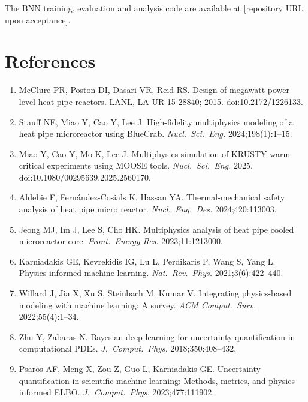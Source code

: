 \documentclass[11pt,a4paper]{article}
\begin{document}
The BNN training, evaluation and analysis code are available at
[repository URL upon acceptance].

\section*{References}

\begin{enumerate}\small
\item McClure PR, Poston DI, Dasari VR, Reid RS. Design of megawatt
      power level heat pipe reactors. LANL, LA-UR-15-28840; 2015.
      doi:10.2172/1226133.
\item Stauff NE, Miao Y, Cao Y, Lee J. High-fidelity multiphysics
      modeling of a heat pipe microreactor using BlueCrab.
      \textit{Nucl.\ Sci.\ Eng.} 2024;198(1):1--15.
\item Miao Y, Cao Y, Mo K, Lee J. Multiphysics simulation of KRUSTY
      warm critical experiments using MOOSE tools.
      \textit{Nucl.\ Sci.\ Eng.} 2025. doi:10.1080/00295639.2025.2560170.
\item Aldebie F, Fern{\'a}ndez-Cosials K, Hassan YA. Thermal-mechanical
      safety analysis of heat pipe micro reactor. \textit{Nucl.\ Eng.\
      Des.} 2024;420:113003.
\item Jeong MJ, Im J, Lee S, Cho HK. Multiphysics analysis of heat pipe
      cooled microreactor core. \textit{Front.\ Energy Res.}
      2023;11:1213000.
\item Karniadakis GE, Kevrekidis IG, Lu L, Perdikaris P, Wang S, Yang L.
      Physics-informed machine learning. \textit{Nat.\ Rev.\ Phys.}
      2021;3(6):422--440.
\item Willard J, Jia X, Xu S, Steinbach M, Kumar V. Integrating
      physics-based modeling with machine learning: A survey. \textit{ACM
      Comput.\ Surv.} 2022;55(4):1--34.
\item Zhu Y, Zabaras N. Bayesian deep learning for uncertainty
      quantification in computational PDEs. \textit{J.\ Comput.\ Phys.}
      2018;350:408--432.
\item Psaros AF, Meng X, Zou Z, Guo L, Karniadakis GE. Uncertainty
      quantification in scientific machine learning: Methods, metrics,
      and physics-informed ELBO. \textit{J.\ Comput.\ Phys.}
      2023;477:111902.

\end{enumerate}
\end{document}

